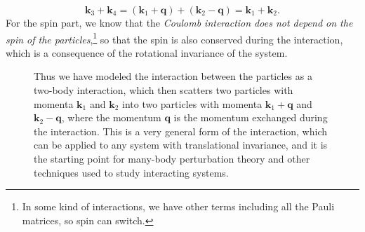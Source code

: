 \[
    \mathbf{k}_3 + \mathbf{k}_4 = (\mathbf{k}_1 + \mathbf{q}) + (\mathbf{k}_2 - \mathbf{q}) = \mathbf{k}_1 + \mathbf{k}_2.
\]
For the spin part, we know that the \textit{Coulomb interaction does not depend on the spin of the particles},\footnote{In some kind of interactions, we have other terms including all the Pauli matrices, so spin can switch.} so that the spin is also conserved during the interaction, which is a consequence of the rotational invariance of the system.
\begin{figure}[H]
    \begin{minipage}{0.45\textwidth}
        Thus we have modeled the interaction between the particles as a two-body interaction, which then scatters two particles with momenta \(\mathbf{k}_1\) and \(\mathbf{k}_2\) into two particles with momenta \(\mathbf{k}_1 + \mathbf{q}\) and \(\mathbf{k}_2 - \mathbf{q}\), where the momentum \(\mathbf{q}\) is the momentum exchanged during the interaction. This is a very general form of the interaction, which can be applied to any system with translational invariance, and it is the starting point for many-body perturbation theory and other techniques used to study interacting systems.
    \end{minipage}
    \hfill
    \begin{minipage}{0.5\textwidth}
        \centering
    \end{minipage}
\end{figure}

